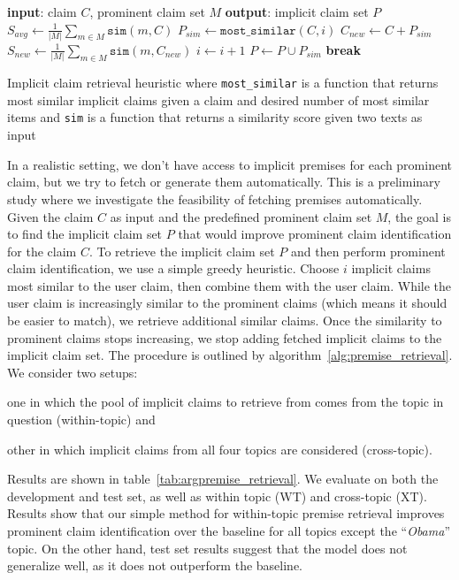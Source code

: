 \begin{algorithm}[t]
\begin{algorithmic}[1]
\State \textbf{input}: claim $C$, prominent claim set $M$
\State \textbf{output}: implicit claim set $P$
\State
\State $S_{avg} \gets \frac{1}{|M|} \sum_{m \in M} \mathtt{sim}(m, C)$
  \State $P_{sim} \gets \mathtt{most\_similar}(C, i)$
  \State $C_{new} \gets C + P_{sim}$
  \State $S_{new} \gets \frac{1}{|M|} \sum_{m \in M} \mathtt{sim}(m, C_{new})$
  \State
    \State $i \gets i + 1$
    \State $P \gets P \cup P_{sim}$
  \Else
    \State \textbf{break}
  \EndIf
  \State
\EndFor
\end{algorithmic}
\caption{Implicit claim retrieval heuristic where \texttt{most\_similar} is a
	function that returns most similar implicit claims given a claim and
	desired number of most similar items and \texttt{sim} is a function that
	returns a similarity score given two texts as input}
\label{alg:premise_retrieval}
\end{algorithm}

In a realistic setting, we don't have access to implicit premises 
for each prominent claim, but we try to fetch or generate them automatically. 
This is a preliminary study where we investigate the feasibility of fetching 
premises automatically. 
Given the claim $C$ as input and the predefined prominent claim set $M$, the
goal is to find the implicit claim set $P$ that would improve prominent claim
identification for the claim $C$. 
To retrieve the implicit claim set $P$ and then perform prominent claim
identification, we use a simple greedy heuristic. 
Choose $i$ implicit claims most similar to the user claim, then combine them
with the user claim.
While the user claim is increasingly similar to the prominent claims (which
means it should be easier to match), we retrieve additional similar claims. 
Once the similarity to prominent claims stops increasing, we stop
adding fetched implicit claims to the implicit claim set. The procedure 
is outlined by algorithm~\ref{alg:premise_retrieval}.
We consider two setups: 
\begin{enumerate*}[label=(\arabic*)]
\item one in which the pool of implicit claims to retrieve
from comes from the topic in question (within-topic) and 
\item other in which implicit claims from all four topics are considered (cross-topic). 
\end{enumerate*}
Results are shown in table~\ref{tab:argpremise_retrieval}. 
We evaluate on both the development and test set, as well as within topic (WT)
and cross-topic (XT). 
Results show that our simple method for within-topic premise retrieval improves
prominent claim identification over the baseline for all topics except the ``\emph{Obama}'' topic. 
On the other hand, test set results suggest that the model does not generalize well, 
as it does not outperform the baseline. 

